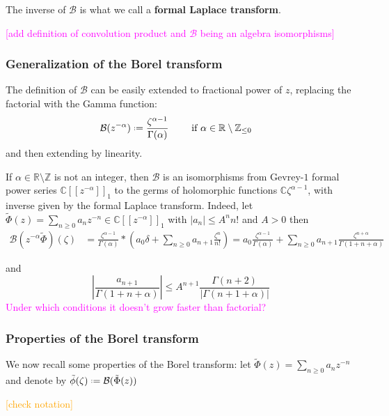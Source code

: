 \documentclass{article}
\newcommand{\Z}{\mathbb{Z}}
\newcommand{\R}{\mathbb{R}}
\newcommand{\C}{\mathbb{C}}
\newcommand*{\defeq}{\mathrel{\vcenter{\baselineskip0.5ex \lineskiplimit0pt
                     \hbox{\scriptsize.}\hbox{\scriptsize.}}}%
                     =}
\begin{document}
The inverse of $\mathcal{B}$ is what we call a \textbf{formal Laplace transform}.

\textcolor{magenta}{[add definition of convolution product and $\mathcal{B}$ being an algebra isomorphisms]}


\subsubsection{Generalization of the Borel transform}
The definition of $\mathcal{B}$ can be easily extended to fractional power of $z$, replacing the factorial with the Gamma function: 
\begin{align*}
\mathcal{B}(z^{-\alpha})\defeq \frac{\zeta^{\alpha-1}}{\Gamma(\alpha)} & \qquad \text{ if } \alpha\in\R\setminus\Z_{\leq 0}
\end{align*}
and then extending by linearity.

If $\alpha\in\mathbb{R}\setminus\Z$ is not an integer, then $\mathcal{B}$ is an isomorphisms from Gevrey-$1$ formal power series $\C[\![z^{-\alpha}]\!]_1$ to the germs of holomorphic functions $\C{\zeta^{\alpha-1}}$, with inverse given by the formal Laplace transform. Indeed, let $\tilde{\Phi}(z)=\sum_{n\geq 0}a_nz^{-n}\in\C[\![z^{-\alpha}]\!]_1$ with $|a_n|\leq A^n n!$ and $A>0$ then  
\begin{align*}
\mathcal{B}(z^{-\alpha}\tilde{\Phi})(\zeta)&=\frac{\zeta^{\alpha-1}}{\Gamma(\alpha)}\ast\left(a_0\delta+\sum_{n\geq 0}a_{n+1}\frac{\zeta^n}{n!}\right)=a_0\frac{\zeta^{\alpha-1}}{\Gamma(\alpha)}+\sum_{n\geq 0}a_{n+1}\frac{\zeta^{n+\alpha}}{\Gamma(1+n+\alpha)}
\end{align*}  

and \[\left|\frac{a_{n+1}}{\Gamma(1+n+\alpha)}\right|\leq A^{n+1}\frac{\Gamma(n+2)}{|\Gamma(n+1+\alpha)|} \]
\textcolor{magenta}{Under which conditions it doesn't grow faster than factorial?}



\subsubsection{Properties of the Borel transform}
We now recall some properties of the Borel transform: let $\tilde{\Phi}(z)=\sum_{n\geq 0}a_nz^{-n}$ and denote by $\tilde{\phi}(\zeta)\defeq\mathcal{B}(\tilde{\Phi}(z))$

\textcolor{orange}{[check notation]}
\end{document}
